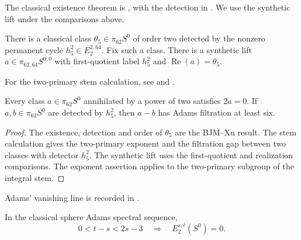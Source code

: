 \begin{proposition}
\label{sem:Literature:theta-five}
The classical existence theorem is \cite[Theorem 2.1]{BJMtheta5}, with
the detection in \cite[Corollary 1.3]{Xu}. We use the synthetic lift
under the comparisons above.\par

There is a classical class $\theta_5\in\pi_{62}S^0$ of order two detected by the nonzero permanent cycle $h_5^2\in E_2^{2,64}$. Fix such a class. There is a synthetic lift $a\in\pi_{62,64}S^{0,0}$ with first-quotient label $h_5^2$ and $\operatorname{Re}(a)=\theta_5$.

For the two-primary stem calculation, see \cite[Corollary 1.3 and Table 1]{IWX} and \cite[Lemma 7.10, proof]{LWX126}.\par

Every class $a\in\pi_{62}S^0$ annihilated by a power of two satisfies $2a=0$. If $a,b\in\pi_{62}S^0$ are detected by $h_5^2$, then $a-b$ has Adams filtration at least six.


\end{proposition}
\begin{proof}
The existence, detection and order of $\theta_5$ are the BJM--Xu result.
The stem calculation gives the two-primary exponent and the filtration
gap between two classes with detector $h_5^2$.
The synthetic lift uses the first-quotient and realization comparisons.
The exponent assertion applies to the two-primary subgroup of the
integral stem.
\end{proof}

\begin{theorem}
\label{sem:Literature:sphere-vanishing}
Adams' vanishing line is recorded in \cite[Proposition 3.3(a)]{MathewTorsion}.\par

In the classical sphere Adams spectral sequence,
\[0<t-s<2s-3\quad\Longrightarrow\quad E_2^{s,t}(S^0)=0.\]


\end{theorem}

